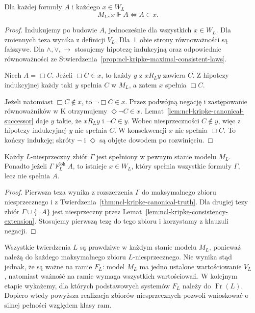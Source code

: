 \begin{twierdzenie}
\label{thm:ncl-kripke-canonical-truth}
Dla każdej formuły $A$ i każdego $x\in W_L$
\[
 M_L,x\Vdash A\iff A\in x.
\]
\end{twierdzenie}
\begin{proof}
Indukujemy po budowie $A$, jednocześnie
dla wszystkich $x\in W_L$.
Dla zmiennych teza wynika z definicji $V_L$.
Dla $\bot$ obie strony równoważności są
fałszywe. Dla $\wedge,\vee,\to$ stosujemy
hipotezę indukcyjną oraz odpowiednie
równoważności ze
Stwierdzenia~\ref{prop:ncl-kripke-maximal-consistent-laws}.

Niech $A=\Box C$. Jeżeli $\Box C\in x$,
to każdy $y$ z $xR_Ly$ zawiera $C$.
Z hipotezy indukcyjnej każdy taki $y$
spełnia $C$ w $M_L$, a zatem $x$ spełnia $\Box C$.

Jeżeli natomiast $\Box C\notin x$,
to $\neg\Box C\in x$. Przez podwójną
negację i zastępowanie równoważników
w K otrzymujemy $\Diamond\neg C\in x$.
Lemat~\ref{lem:ncl-kripke-canonical-successor}
daje $y$ takie, że $xR_Ly$ i $\neg C\in y$.
Wobec niesprzeczności $C\notin y$,
więc z hipotezy indukcyjnej $y$ nie spełnia $C$.
W konsekwencji $x$ nie spełnia $\Box C$.
To kończy indukcję; skróty $\neg$ i $\Diamond$
są objęte dowodem po rozwinięciu.
\end{proof}

\begin{wniosek}
\label{cor:ncl-kripke-canonical-realization}
Każdy $L$-niesprzeczny zbiór $\Gamma$
jest spełniony w pewnym stanie modelu $M_L$.
Ponadto jeżeli $\Gamma\not\vdash_L^{\mathrm{lok}}A$,
to istnieje $x\in W_L$, który spełnia wszystkie
formuły $\Gamma$, lecz nie spełnia $A$.
\end{wniosek}
\begin{proof}
Pierwsza teza wynika z rozszerzenia $\Gamma$
do maksymalnego zbioru niesprzecznego i z
Twierdzenia~\ref{thm:ncl-kripke-canonical-truth}.
Dla drugiej tezy zbiór $\Gamma\cup\{\neg A\}$
jest niesprzeczny przez
Lemat~\ref{lem:ncl-kripke-consistency-extension}.
Stosujemy pierwszą tezę do tego zbioru
i korzystamy z klauzuli negacji.
\end{proof}

\begin{uwaga}
\label{rem:ncl-kripke-canonical-model-frame}
Wszystkie twierdzenia $L$ są prawdziwe w każdym
stanie modelu $M_L$, ponieważ należą do każdego
maksymalnego zbioru $L$-niesprzecznego.
Nie wynika stąd jednak, że są ważne na ramie
$F_L$: model $M_L$ ma jedno ustalone
wartościowanie $V_L$, natomiast ważność
na ramie wymaga wszystkich wartościowań.
W kolejnym etapie wykażemy, dla których
podstawowych systemów $F_L$ należy do
$\operatorname{Fr}(L)$. Dopiero wtedy powyższa
realizacja zbiorów niesprzecznych pozwoli
wnioskować o silnej pełności względem klasy ram.
\end{uwaga}

